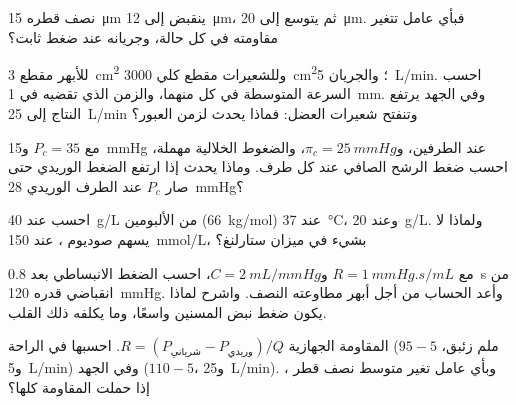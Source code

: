 \begin{exercise}[$\star\star$]\label{exo:b2:blood-circulation:6}
 نصف قطره \qty{15}{\micro m} ينقبض إلى
\qty{12}{\micro m}، ثم يتوسع إلى \qty{20}{\micro m}. فبأي
عامل تتغير مقاومته في كل حالة، وجريانه عند
ضغط ثابت؟
\end{exercise}

\begin{exercise}[$\star\star$]\label{exo:b2:blood-circulation:7}
للأبهر مقطع \qty{3}{cm^2} وللشعيرات مقطع
كلي \qty{3000}{cm^2}؛ والجريان \qty{5}{L/min}. احسب
السرعة المتوسطة في كل منهما، والزمن الذي تقضيه  في
 \qty{1}{mm}. وفي الجهد يرتفع النتاج إلى
\qty{25}{L/min} وتنفتح شعيرات العضل: فماذا يحدث
لزمن العبور؟
\end{exercise}

\begin{exercise}[$\star\star$]\label{exo:b2:blood-circulation:8}
مع $P_c = 35$ و\qty{15}{mmHg} عند الطرفين، و$\pi_c =
\qty{25}{mmHg}$، والضغوط الخلالية مهملة، احسب ضغط
الرشح الصافي عند كل طرف. وماذا يحدث إذا ارتفع الضغط الوريدي
حتى صار $P_c$ عند الطرف الوريدي \qty{28}{mmHg}؟
\end{exercise}

\begin{exercise}[$\star\star$]\label{exo:b2:blood-circulation:9}
احسب  عند \qty{40}{g/L} من الألبومين
(\qty{66}{kg/mol}) عند \qty{37}{\celsius}، وعند \qty{20}{g/L}. ولماذا
لا يسهم صوديوم ، عند \qty{150}{mmol/L}، بشيء
في ميزان ستارلنغ؟
\end{exercise}

\begin{exercise}[$\star\star\star$]\label{exo:b2:blood-circulation:10}
مع $R = \qty{1}{mmHg.s/mL}$ و$C = \qty{2}{mL/mmHg}$، احسب
الضغط الانبساطي بعد \qty{0.8}{s} من انقباضي قدره
\qty{120}{mmHg}. وأعد الحساب من أجل أبهر مطاوعته النصف. واشرح لماذا
يكون ضغط نبض المسنين واسعًا، وما يكلفه ذلك
القلب.
\end{exercise}

\begin{exercise}[$\star\star\star$]\label{exo:b2:blood-circulation:11}
المقاومة الجهازية $R = (P_{\text{شرياني}} - P_{\text{وريدي}})/Q$.
احسبها في الراحة ($95 - 5$ ملم زئبق، و\qty{5}{L/min}) وفي الجهد
($110 - 5$، و\qty{25}{L/min}). وبأي عامل تغير متوسط نصف قطر
، إذا حملت  المقاومة كلها؟
\end{exercise}

